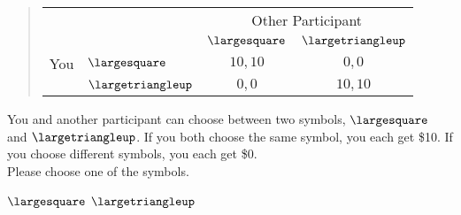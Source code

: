 \documentclass[11pt]{article}
\begin{document}
\begin{tcolorbox}
\begin{quote}
\begin{center}
\begin{tabular}{llcc}
    & & \multicolumn{2}{c}{Other Participant}  \\
  &  & $\largesquare$ & $\largetriangleup$  \\ \cline{3-4}
You & $\largesquare$ & \multicolumn{1}{|c|}{$10,10$} & \multicolumn{1}{c|}{$0,0$}  \\ \cline{3-4}
& $\largetriangleup$ & \multicolumn{1}{|c|}{$0,0$} & \multicolumn{1}{c|}{$10,10$}  \\ \cline{3-4}
\end{tabular}
\end{center}
\end{quote}

You and another participant can choose between two symbols, $\largesquare$ and $\largetriangleup$. If you both choose the same symbol, you each get \$10. If you choose different symbols, you each get \$0.\\

Please choose one of the symbols.\\

\begin{center}
$\largesquare$ \qquad $\largetriangleup$
\end{center}
\end{tcolorbox}
\end{document}
